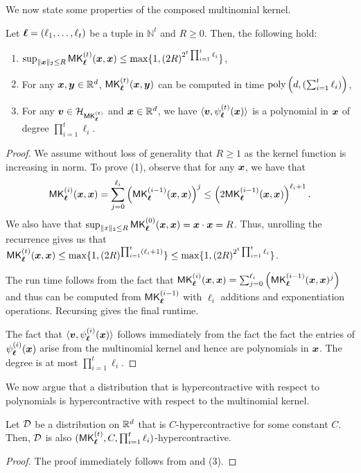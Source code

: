 We now state some properties of the composed multinomial kernel.
\begin{lemma}
\label{lem:composed_multinomial_properties}
    Let $\boldsymbol{\ell}=(\ell_1,\ldots,\ell_{t})$ be a tuple in $\mathbb{N}^{t}$ and $R\geq 0$. Then, the following hold: 
    \begin{enumerate}
        \item $\sup_{\|{\bm{x}}\|_{2}\leq R}\mathsf{MK}_{\boldsymbol{\ell}}^{(t)}({\bm{x}},{\bm{x}})\leq \max\{1,(2R)^{2^{t}\prod_{i=1}^{t}\ell_{i}}\}$,
        \item For any ${\bm{x}},{\bm{y}}\in \mathbb{R}^{d}$, $\mathsf{MK}_{\boldsymbol{\ell}}^{(t)}({\bm{x}},{\bm{y}})$ can be computed in time $\mathrm{poly}\left(d, (\sum_{i=1}^{t}\ell_i)\right)$,
        \item For any ${\bm{v}}\in \mathcal{H}_{\mathsf{MK}_{\boldsymbol{\ell}}^{(t)}}$ and ${\bm{x}}\in \mathbb{R}^{d}$, we have $\langle{\bm{v}},\psi_{\boldsymbol{\ell}}^{(t)}({\bm{x}})\rangle$ is a polynomial in ${\bm{x}}$ of degree $\prod_{i=1}^{t}\ell_i$.
    \end{enumerate}
\end{lemma}
\begin{proof}
    We assume without loss of generality that $R\geq 1$ as the kernel function is increasing in norm. To prove (1), observe that for any ${\bm{x}}$, we have that
    \[\mathsf{MK}_{\boldsymbol{\ell}}^{(i)}({\bm{x}},{\bm{x}})=\sum_{j=0}^{\ell_i}\left(\mathsf{MK}_{\boldsymbol{\ell}}^{(i-1)}({\bm{x}},{\bm{x}})\right)^{j}\leq \left(2\mathsf{MK}_{\boldsymbol{\ell}}^{(i-1)}({\bm{x}},{\bm{x}})\right)^{\ell_i+1}.\]
We also have that $\sup_{\|x\|_{2}\leq R}\mathsf{MK}_{\boldsymbol{\ell}}^{(0)}({\bm{x}},{\bm{x}})={\bm{x}}\cdot {\bm{x}}=R$. Thus, unrolling the recurrence gives us that $\mathsf{MK}_{\boldsymbol{\ell}}^{(t)}({\bm{x}},{\bm{x}})\leq \max\{1,(2R)^{\prod_{i=1}^{t}(\ell_i+1)}\}\leq \max\{1,(2R)^{2^{t}\prod_{i=1}^{t}\ell_{i}}\}$.

The run time follows from the fact that $\mathsf{MK}_{\boldsymbol{\ell}}^{(i)}({\bm{x}},{\bm{x}})=\sum_{j=0}^{\ell_i}\left(\mathsf{MK}_{\boldsymbol{\ell}}^{(i-1)}({\bm{x}},{\bm{x}})^{j}\right)$ and thus can be computed from $\mathsf{MK}_{\boldsymbol{\ell}}^{(i-1)}$ with $\ell_i$ additions and exponentiation operations. Recursing gives the final runtime.

The fact that $\langle{\bm{v}},\psi_{\boldsymbol{\ell}}^{(i)}({\bm{x}})\rangle$ follows immediately from the fact the fact the entries of $\psi_{\boldsymbol{\ell}}^{(i)}({\bm{x}})$ arise from the multinomial kernel and hence are polynomials in ${\bm{x}}$. The degree is at most $\prod_{i=1}^{t}\ell_i$.
\end{proof}
We now argue that a distribution that is hypercontractive with respect to polynomials is hypercontractive with respect to the multinomial kernel.
\begin{lemma}
\label{lem:hc_implies_kernelhc}
    Let ${\mathcal{D}}$ be a distribution on $\mathbb{R}^{d}$ that is $C$-hypercontractive for some constant $C$. Then, ${\mathcal{D}}$ is also $(\mathsf{MK}_{\boldsymbol{\ell}}^{(t)},C,\prod_{i=1}^{t}\ell_i)$-hypercontractive.
\end{lemma}
\begin{proof}
    The proof immediately follows from  and (3).
\end{proof}
